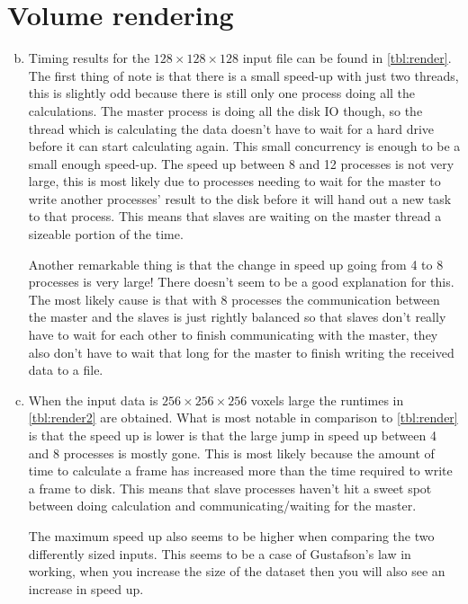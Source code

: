 \documentclass[a4paper]{article}
\begin{document}
\section{Volume rendering}
\begin{enumerate}[(a)]
	\setcounter{enumi}{1}
	\item Timing results for the $128 \times 128 \times 128$ input file can be found in \autoref{tbl:render}. The first thing of note is that there is a small speed-up with just two threads, this is slightly odd because there is still only one process doing all the calculations. The master process is doing all the disk IO though, so the thread which is calculating the data doesn't have to wait for a hard drive before it can start calculating again. This small concurrency is enough to be a small enough speed-up. The speed up between 8 and 12 processes is not very large, this is most likely due to processes needing to wait for the master to write another processes' result to the disk before it will hand out a new task to that process. This means that slaves are waiting on the master thread a sizeable portion of the time.
	
	Another remarkable thing is that the change in speed up going from 4 to 8 processes is very large! There doesn't seem to be a good explanation for this. The most likely cause is that with 8 processes the communication between the master and the slaves is just rightly balanced so that slaves don't really have to wait for each other to finish communicating with the master, they also don't have to wait that long for the master to finish writing the received data to a file.
	
	\item When the input data is $256 \times 256 \times 256$ voxels large the runtimes in \autoref{tbl:render2} are obtained. What is most notable in comparison to \autoref{tbl:render} is that the speed up is lower is that the large jump in speed up between 4 and 8 processes is mostly gone. This is most likely because the amount of time to calculate a frame has increased more than the time required to write a frame to disk. This means that slave processes haven't hit a sweet spot between doing calculation and communicating/waiting for the master.
	
	The maximum speed up also seems to be higher when comparing the two differently sized inputs. This seems to be a case of Gustafson's law in working, when you increase the size of the dataset then you will also see an increase in speed up.
\end{enumerate}
\end{document}
